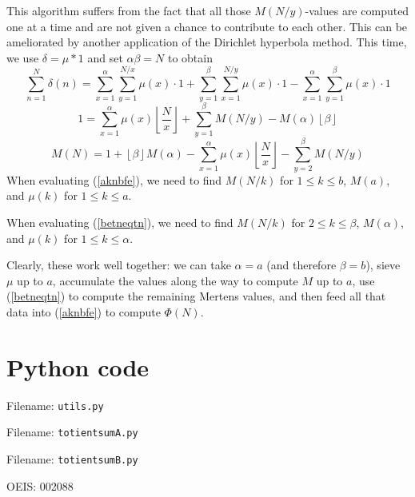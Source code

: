 \documentclass[12pt]{article}
\newcommand{\eqn}[1]{\begin{displaymath} #1 \end{displaymath}}
\newcommand{\neqn}[1]{\begin{equation} #1 \end{equation}}
\newcommand{\floor}[1]{{\left\lfloor #1 \right\rfloor}}
\newcommand{\showcode}[1]{Filename: \texttt{#1.py} }
\newcommand{\floordiv}[2]{\floor{\frac{#1}{#2}}}
\begin{document}
This algorithm suffers from the fact that all those $M(N/y)$-values are computed one at a time and are not given a chance to contribute to each other.  This can be ameliorated by another application of the Dirichlet hyperbola method.  This time, we use $\delta = \mu * 1$ and set $\alpha\beta=N$ to obtain
\eqn{\sum_{n=1}^N \delta(n) = \sum_{x=1}^{\alpha}\sum_{y=1}^{N/x} \mu(x) \cdot 1 + \sum_{y=1}^{\beta}\sum_{x=1}^{N/y} \mu(x) \cdot 1 - \sum_{x=1}^{\alpha}\sum_{y=1}^{\beta} \mu(x) \cdot 1}
\eqn{1 = \sum_{x=1}^{\alpha} \mu(x) \floordiv{N}{x} + \sum_{y=1}^{\beta} M(N/y) - M(\alpha) \floor{\beta}}
\neqn{M(N) = 1 + \floor{\beta} M(\alpha) - \sum_{x=1}^{\alpha} \mu(x) \floordiv{N}{x} - \sum_{y=2}^{\beta} M(N/y) \label{betneqtn}}
When evaluating (\ref{aknbfe}), we need to find $M(N/k)$ for $1 \leq k \leq b$, $M(a)$, and $\mu(k)$ for $1 \leq k \leq a$.

When evaluating (\ref{betneqtn}), we need to find $M(N/k)$ for $2 \leq k \leq \beta$, $M(\alpha)$, and $\mu(k)$ for $1 \leq k \leq \alpha$.

Clearly, these work well together: we can take $\alpha=a$ (and therefore $\beta=b$), sieve $\mu$ up to $a$, accumulate the values along the way to compute $M$ up to $a$, use (\ref{betneqtn}) to compute the remaining Mertens values, and then feed all that data into (\ref{aknbfe}) to compute $\Phi(N)$.


\section{Python code}


Filename: \texttt{utils.py}


Filename: \texttt{totientsumA.py}


Filename: \texttt{totientsumB.py}




\nocite{*}

OEIS: 002088

\setlength{\bibitemsep}{\parskip}
\printbibliography[heading=bibnumbered]
\end{document}
